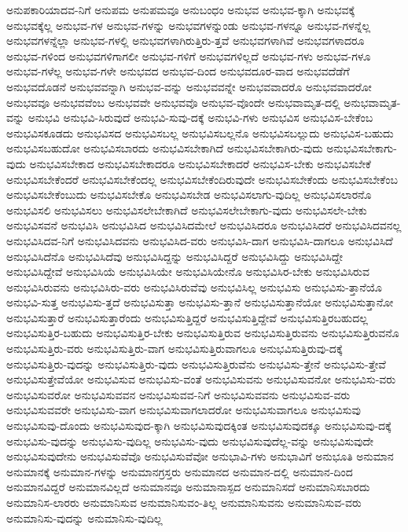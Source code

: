 {ಅನುಪಕಾರಿಯಾದವ-ನಿಗೆ
ಅನುಪಮ
ಅನುಪಮವೂ
ಅನುಬಂಧಂ
ಅನುಭವ
ಅನುಭವ-ಕ್ಕಾಗಿ
ಅನುಭವಕ್ಕೆ
ಅನುಭವಕ್ಕೆಲ್ಲ
ಅನುಭವ-ಗಳ
ಅನುಭವ-ಗಳನ್ನು
ಅನುಭವಗಳನ್ನುಂಡು
ಅನುಭವ-ಗಳನ್ನೂ
ಅನುಭವ-ಗಳನ್ನೆಲ್ಲ
ಅನುಭವಗಳನ್ನೆಲ್ಲಾ
ಅನುಭವ-ಗಳಲ್ಲಿ
ಅನುಭವಗಳಾಗಿರುತ್ತಿರು-ತ್ತವೆ
ಅನುಭವಗಳಾಗಿವೆ
ಅನುಭವಗಳಾದರೂ
ಅನುಭವ-ಗಳಿಂದ
ಅನುಭವಗಳಿಗಾಗಲೀ
ಅನುಭವ-ಗಳಿಗೆ
ಅನುಭವಗಳಿಲ್ಲದೆ
ಅನುಭವ-ಗಳು
ಅನುಭವ-ಗಳೂ
ಅನುಭವ-ಗಳೆಲ್ಲ
ಅನುಭವ-ಗಳೇ
ಅನುಭವದ
ಅನುಭವ-ದಿಂದ
ಅನುಭವದೂರ-ವಾದ
ಅನುಭವದೆಡೆಗೆ
ಅನುಭವದೊಡನೆ
ಅನುಭವವನ್ನಾಗಿ
ಅನುಭವ-ವನ್ನು
ಅನುಭವವನ್ನೇ
ಅನುಭವವಾದರೊ
ಅನುಭವವಾದರೋ
ಅನುಭವವೂ
ಅನುಭವವೆಂಬ
ಅನುಭವವೇ
ಅನುಭವವೊ
ಅನುಭವ-ವೊಂದೇ
ಅನುಭವಾಮೃತ-ದಲ್ಲಿ
ಅನುಭವಾಮೃತ-ವನ್ನು
ಅನುಭವಿ
ಅನುಭವಿ-ಸಿರುವುದೆ
ಅನುಭವಿ-ಸುವು-ದಕ್ಕೆ
ಅನುಭವಿ-ಗಳು
ಅನುಭವಿಸ
ಅನುಭವಿಸ-ಬೇಕೆಂಬ
ಅನುಭವಿಸಕೂಡದು
ಅನುಭವಿಸದ
ಅನುಭವಿಸಬಲ್ಲ
ಅನುಭವಿಸಬಲ್ಲನೊ
ಅನುಭವಿಸಬಲ್ಲುದು
ಅನುಭವಿಸ-ಬಹುದು
ಅನುಭವಿಸಬಹುದೋ
ಅನುಭವಿಸಬಾರದು
ಅನುಭವಿಸಬೇಕಾಗಿದೆ
ಅನುಭವಿಸಬೇಕಾಗಿರು-ವುದು
ಅನುಭವಿಸಬೇಕಾಗು-ವುದು
ಅನುಭವಿಸಬೇಕಾದ
ಅನುಭವಿಸಬೇಕಾದರೂ
ಅನುಭವಿಸಬೇಕಾದರೆ
ಅನುಭವಿಸ-ಬೇಕು
ಅನುಭವಿಸಬೇಕೆ
ಅನುಭವಿಸಬೇಕೆಂದರೆ
ಅನುಭವಿಸಬೇಕೆಂದಲ್ಲ
ಅನುಭವಿಸಬೇಕೆಂದಿರುವುದೇ
ಅನುಭವಿಸಬೇಕೆಂದು
ಅನುಭವಿಸಬೇಕೆಂಬ
ಅನುಭವಿಸಬೇಕೆಂಬುದು
ಅನುಭವಿಸಬೇಕೊ
ಅನುಭವಿಸಬೇಡ
ಅನುಭವಿಸಲಾಗು-ವುದಿಲ್ಲ
ಅನುಭವಿಸಲಾರನೊ
ಅನುಭವಿಸಲಿ
ಅನುಭವಿಸಲು
ಅನುಭವಿಸಲೇಬೇಕಾಗಿದೆ
ಅನುಭವಿಸಲೇಬೇಕಾಗು-ವುದು
ಅನುಭವಿಸಲೇ-ಬೇಕು
ಅನುಭವಿಸವನೆ
ಅನುಭವಿಸಿ
ಅನುಭವಿಸಿದ
ಅನುಭವಿಸಿದಮೇಲೆ
ಅನುಭವಿಸಿದರೂ
ಅನುಭವಿಸಿದರೆ
ಅನುಭವಿಸಿದವನಲ್ಲ
ಅನುಭವಿಸಿದವ-ನಿಗೆ
ಅನುಭವಿಸಿದವನು
ಅನುಭವಿಸಿದ-ವರು
ಅನುಭವಿಸಿ-ದಾಗ
ಅನುಭವಿಸಿ-ದಾಗಲೂ
ಅನುಭವಿಸಿದೆ
ಅನುಭವಿಸಿದೆನೊ
ಅನುಭವಿಸಿದೆವು
ಅನುಭವಿಸಿದ್ದನ್ನು
ಅನುಭವಿಸಿದ್ದರೆ
ಅನುಭವಿಸಿದ್ದು
ಅನುಭವಿಸಿದ್ದೇ
ಅನುಭವಿಸಿದ್ದೇವೆ
ಅನುಭವಿಸಿಯೆ
ಅನುಭವಿಸಿಯೇ
ಅನುಭವಿಸಿಯೇನೊ
ಅನುಭವಿಸಿರ-ಬೇಕು
ಅನುಭವಿಸಿರುವ
ಅನುಭವಿಸಿರುವನು
ಅನುಭವಿಸಿರು-ವರು
ಅನುಭವಿಸಿರುವೆವು
ಅನುಭವಿಸಿಲ್ಲ
ಅನುಭವಿಸು
ಅನುಭವಿಸು-ತ್ತಾನೆಯೊ
ಅನುಭವಿ-ಸುತ್ತ
ಅನುಭವಿಸು-ತ್ತದೆ
ಅನುಭವಿಸುತ್ತಾ
ಅನುಭವಿಸು-ತ್ತಾನೆ
ಅನುಭವಿಸುತ್ತಾನೆಯೋ
ಅನುಭವಿಸುತ್ತಾನೋ
ಅನುಭವಿಸುತ್ತಾರೆ
ಅನುಭವಿಸುತ್ತಾರೆಂದು
ಅನುಭವಿಸುತ್ತಿದ್ದರೆ
ಅನುಭವಿಸುತ್ತಿದ್ದೇವೆ
ಅನುಭವಿಸುತ್ತಿರಬಹುದಲ್ಲ
ಅನುಭವಿಸುತ್ತಿರ-ಬಹುದು
ಅನುಭವಿಸುತ್ತಿರ-ಬೇಕು
ಅನುಭವಿಸುತ್ತಿರುವ
ಅನುಭವಿಸುತ್ತಿರುವನು
ಅನುಭವಿಸುತ್ತಿರುವನೊ
ಅನುಭವಿಸುತ್ತಿರು-ವರು
ಅನುಭವಿಸುತ್ತಿರು-ವಾಗ
ಅನುಭವಿಸುತ್ತಿರುವಾಗಲೂ
ಅನುಭವಿಸುತ್ತಿರುವು-ದಕ್ಕೆ
ಅನುಭವಿಸುತ್ತಿರು-ವುದನ್ನು
ಅನುಭವಿಸುತ್ತಿರು-ವುದು
ಅನುಭವಿಸುತ್ತಿರುವೆನು
ಅನುಭವಿಸು-ತ್ತೇನೆ
ಅನುಭವಿಸು-ತ್ತೇವೆ
ಅನುಭವಿಸುತ್ತೇವೆಯೋ
ಅನುಭವಿಸುವ
ಅನುಭವಿಸು-ವಂತೆ
ಅನುಭವಿಸುವನು
ಅನುಭವಿಸುವನೋ
ಅನುಭವಿಸು-ವರು
ಅನುಭವಿಸುವರೋ
ಅನುಭವಿಸುವವನ
ಅನುಭವಿಸುವವ-ನಿಗೆ
ಅನುಭವಿಸುವವನು
ಅನುಭವಿಸುವ-ವರು
ಅನುಭವಿಸುವವರೇ
ಅನುಭವಿಸು-ವಾಗ
ಅನುಭವಿಸುವಾಗಲಾದರೋ
ಅನುಭವಿಸುವಾಗಲೂ
ಅನುಭವಿಸುವು
ಅನುಭವಿಸುವು-ದೊಂದು
ಅನುಭವಿಸುವುದ-ಕ್ಕಾಗಿ
ಅನುಭವಿಸುವುದಕ್ಕಿಂತ
ಅನುಭವಿಸುವುದಕ್ಕೂ
ಅನುಭವಿಸುವು-ದಕ್ಕೆ
ಅನುಭವಿಸು-ವುದನ್ನು
ಅನುಭವಿಸು-ವುದಿಲ್ಲ
ಅನುಭವಿಸು-ವುದು
ಅನುಭವಿಸುವುದೆಲ್ಲ-ವನ್ನು
ಅನುಭವಿಸುವುದೇ
ಅನುಭವಿಸುವುದೇನು
ಅನುಭವಿಸುವೆವೊ
ಅನುಭವಿಸುವೆವೋ
ಅನುಭಾವಿ-ಗಳು
ಅನುಭಾವಿಗೆ
ಅನುಭೂತಿ
ಅನುಮಾನ
ಅನುಮಾನಕ್ಕೆ
ಅನುಮಾನ-ಗಳನ್ನು
ಅನುಮಾನಗ್ರಸ್ತರು
ಅನುಮಾನದ
ಅನುಮಾನ-ದಲ್ಲಿ
ಅನುಮಾನ-ದಿಂದ
ಅನುಮಾನವಿದ್ದರೆ
ಅನುಮಾನವಿಲ್ಲದೆ
ಅನುಮಾನವೂ
ಅನುಮಾನಾಸ್ಪದ
ಅನುಮಾನಿಸದೆ
ಅನುಮಾನಿಸಬಾರದು
ಅನುಮಾನಿಸ-ಲಾರರು
ಅನುಮಾನಿಸುವ
ಅನುಮಾನಿಸುವಂ-ತಿಲ್ಲ
ಅನುಮಾನಿಸುವನು
ಅನುಮಾನಿಸುವ-ವರು
ಅನುಮಾನಿಸು-ವುದನ್ನು
ಅನುಮಾನಿಸು-ವುದಿಲ್ಲ
}
